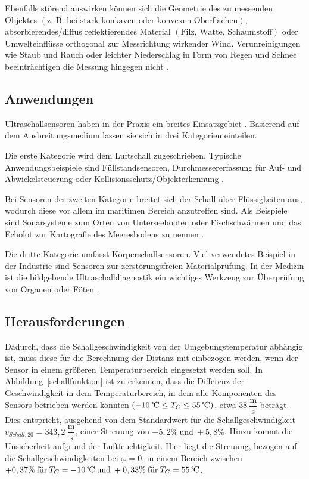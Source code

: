 Ebenfalls störend auswirken können sich die Geometrie des zu messenden Objektes $\left(\text{z. B. bei stark konkaven oder konvexen Oberflächen}\right)$, absorbierendes/diffus reflektierendes Material $\left(\text{Filz, Watte, Schaumstoff}\right)$ oder Umwelteinflüsse orthogonal zur Messrichtung wirkender Wind. Verunreinigungen wie Staub und Rauch oder leichter Niederschlag in Form von Regen und Schnee beeinträchtigen die Messung hingegen nicht \cite{Hering:2023}.

\subsection{Anwendungen}

Ultraschallsensoren haben in der Praxis ein breites Einsatzgebiet \cite{Hering:2023}. Basierend auf dem Ausbreitungsmedium lassen sie sich in drei Kategorien einteilen.

Die erste Kategorie wird dem Luftschall zugeschrieben. Typische Anwendungsbeispiele sind Füllstandsensoren, Durchmessererfassung für Auf- und Abwickelsteuerung oder Kollisionsschutz/Objekterkennung \cite{Hering:2023}.

Bei Sensoren der zweiten Kategorie breitet sich der Schall über Flüssigkeiten aus, wodurch diese vor allem im maritimen Bereich anzutreffen sind. Als Beispiele sind Sonarsysteme zum Orten von Unterseebooten oder Fischschwärmen und das Echolot zur Kartografie des Meeresbodens zu nennen \cite{Hering:2021b}.

Die dritte Kategorie umfasst Körperschallsensoren. Viel verwendetes Beispiel in der Industrie sind Sensoren zur zerstörungsfreien Materialprüfung. In der Medizin ist die bildgebende Ultraschalldiagnostik ein wichtiges Werkzeug zur Überprüfung von Organen oder Föten \cite{Hering:2021b}.


\subsection{Herausforderungen}

Dadurch, dass die Schallgeschwindigkeit von der Umgebungstemperatur abhängig ist, muss diese für die Berechnung der Distanz mit einbezogen werden, wenn der Sensor in einem größeren Temperaturbereich eingesetzt werden soll. In Abbildung~\ref{schallfunktion} ist zu erkennen, dass die Differenz der Geschwindigkeit in dem Temperaturbereich, in dem alle Komponenten des Sensors betrieben werden könnten $\left(-10 \:\text{\textcelsius}\leq T_{C}\leq55 \:\text{\textcelsius}\right)$, etwa $38 \:\dfrac{\text{m}}{\text{s}}$ beträgt. Dies entspricht, ausgehend von dem Standardwert für die Schallgeschwindigkeit $v_{Schall,20}=343,2\:\dfrac{\text{m}}{\text{s}}$, einer Streuung von $-5,2\% \:\text{und} \:+5,8\%$. Hinzu kommt die Unsicherheit aufgrund der Luftfeuchtigkeit. Hier liegt die Streuung, bezogen auf die Schallgeschwindigkeiten bei $\varphi=0$, in einem Bereich zwischen $+0,37\% \:\text{für} \:T_{C}=-10\:\text{\textcelsius} \:\text{und} \:+0,33\% \:\text{für} \:T_{C}=55 \:\text{\textcelsius}$.

